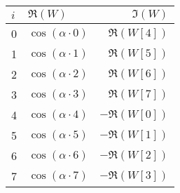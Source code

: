 \begin{tabular}{|l|l|r|}
	\hline
	$i$ & $\Re(W)$ & $\Im(W)$ \\ \hline
	0 & $\cos(\alpha \cdot 0)$ & $\Re(W[4])$ \\
	1 & $\cos(\alpha \cdot 1)$ & $\Re(W[5])$ \\
	2 & $\cos(\alpha \cdot 2)$ & $\Re(W[6])$ \\
	3 & $\cos(\alpha \cdot 3)$ & $\Re(W[7])$ \\	
	4 & $\cos(\alpha \cdot 4)$ & $-\Re(W[0])$ \\
	5 & $\cos(\alpha \cdot 5)$ & $-\Re(W[1])$ \\
	6 & $\cos(\alpha \cdot 6)$ & $-\Re(W[2])$ \\
	7 & $\cos(\alpha \cdot 7)$ & $-\Re(W[3])$ \\ \hline
\end{tabular}